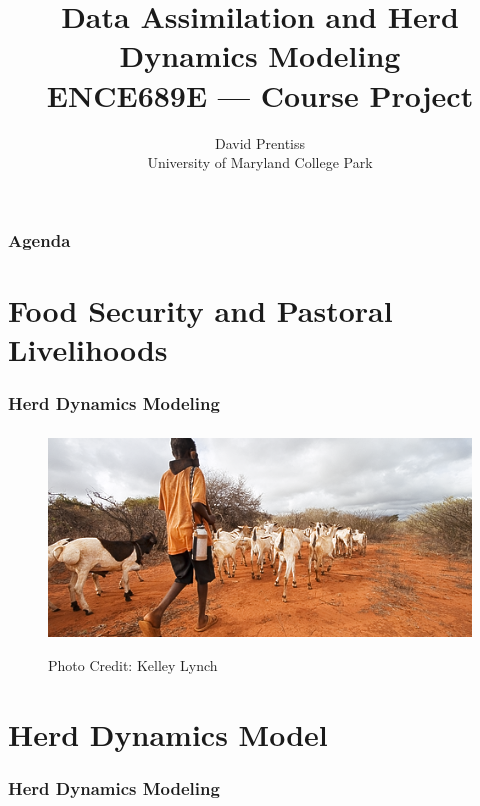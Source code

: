 \documentclass[mathserif]{beamer}
\begin{document}
\nobibliography*
\title{Data Assimilation and Herd Dynamics Modeling \\ ENCE689E --- Course Project}
\author{David Prentiss \\ University of Maryland College Park}

\frame{\titlepage}

\begin{frame}
  \frametitle{Agenda}
  \tableofcontents
\end{frame}

\section{Food Security and Pastoral Livelihoods}

\begin{frame}
\frametitle{Herd Dynamics Modeling}
\tableofcontents[currentsection]
\end{frame}

\begin{frame}
\begin{figure}
\begin{center}
\frametitle{\insertsection}
\includegraphics[width=1\textwidth]{image}

Photo Credit: Kelley Lynch
\end{center}
\end{figure}
\end{frame}

\section{Herd Dynamics Model}

\begin{frame}
\frametitle{Herd Dynamics Modeling}
\tableofcontents[currentsection]
\end{frame}
\end{document}
